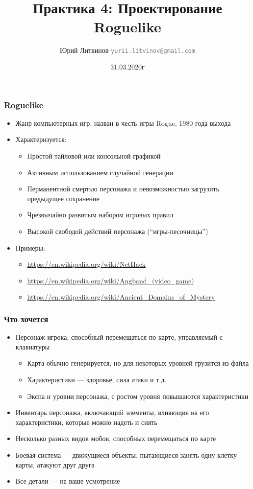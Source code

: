 \documentclass[xetex,mathserif,serif]{beamer}
\title{Практика 4: Проектирование Roguelike}
\author[Юрий Литвинов]{Юрий Литвинов \newline \textcolor{gray}{\small\texttt{yurii.litvinov@gmail.com}}}
\date{31.03.2020г}
\begin{document}
	\maketitle

	\begin{frame}
		\frametitle{Roguelike}
		\begin{itemize}
			\item Жанр компьютерных игр, назван в честь игры Rogue, 1980 года выхода
			\item Характеризуется:
			\begin{itemize}
				\item Простой тайловой или консольной графикой
				\item Активным использованием случайной генерации
				\item Перманентной смертью персонажа и невозможностью загрузить предыдущее сохранение
				\item Чрезвычайно развитым набором игровых правил
				\item Высокой свободой действий персонажа (``игры-песочницы'')
			\end{itemize}
			\item Примеры:
			\begin{itemize}
				\item \url{https://en.wikipedia.org/wiki/NetHack}
				\item \url{https://en.wikipedia.org/wiki/Angband_(video_game)}
				\item \url{https://en.wikipedia.org/wiki/Ancient_Domains_of_Mystery}
			\end{itemize}
		\end{itemize}
	\end{frame}

	\begin{frame}
		\frametitle{Что хочется}
		\begin{itemize}
			\item Персонаж игрока, способный перемещаться по карте, управляемый с клавиатуры
			\begin{itemize}
				\item Карта обычно генерируется, но для некоторых уровней грузится из файла
				\item Характеристики --- здоровье, сила атаки и т.д.
				\item Экспа и уровни персонажа, с ростом уровня повышаются характеристики
			\end{itemize}
			\item Инвентарь персонажа, включающий элементы, влияющие на его характеристики, которые можно надеть и снять
			\item Несколько разных видов мобов, способных перемещаться по карте
			\item Боевая система --- движущиеся объекты, пытающиеся занять одну клетку карты, атакуют друг друга
			\item Все детали --- на ваше усмотрение
		\end{itemize}
	\end{frame}
\end{document}
